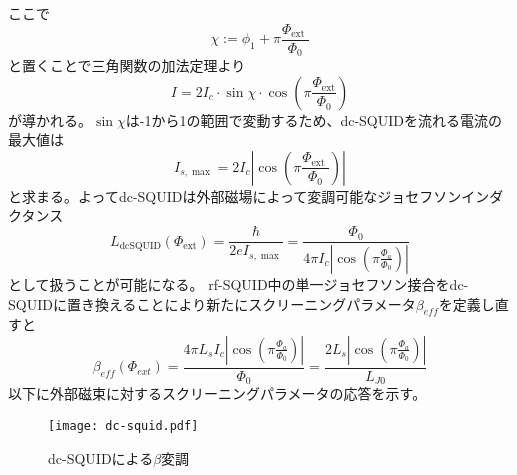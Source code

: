         ここで
        \begin{equation}
            \chi:=\phi_{1}+\pi \frac{\Phi_{\text {ext }}}{\Phi_{0}}
        \end{equation}
        と置くことで三角関数の加法定理より
        \begin{equation}
            I=2 I_{c} \cdot \sin \chi \cdot \cos \left(\pi \frac{\Phi_{\mathrm{ext}}}{\Phi_{0}}\right)
            \end{equation}
        が導かれる。$\sin\chi$は-1から1の範囲で変動するため、dc-SQUIDを流れる電流の最大値は
        \begin{equation}
            I_{s, \max }=2 I_{c}\left|\cos \left(\pi \frac{\Phi_{\text {ext }}}{\Phi_{0}}\right)\right|
        \end{equation}
        と求まる。よってdc-SQUIDは外部磁場によって変調可能なジョセフソンインダクタンス
        \begin{equation}
            L_{\mathrm{dcSQUID}}\left(\Phi_{\mathrm{ext}}\right)=\frac{\hbar}{2 e I_{s, \max }}=\frac{\Phi_{0}}{4 \pi I_{c}\left|\cos \left(\pi \frac{\Phi_{a}}{\Phi_{0}}\right)\right|}
        \end{equation}
        として扱うことが可能になる。
        rf-SQUID中の単一ジョセフソン接合をdc-SQUIDに置き換えることにより新たにスクリーニングパラメータ$\beta_{eff}$を定義し直すと
        \begin{equation}
            \beta_{eff}(\Phi_{ext}) = \frac{4\pi L_{s}I_{c}\left|\cos \left(\pi \frac{\Phi_{a}}{\Phi_{0}}\right)\right|}{\Phi_0}=\frac{2L_s\left|\cos \left(\pi \frac{\Phi_{a}}{\Phi_{0}}\right)\right|}{L_{J0}}
        \end{equation}
        以下に外部磁束に対するスクリーニングパラメータの応答を示す。
        \begin{figure}[H]
            \centering
            \texttt{[image: dc-squid.pdf]}
            \caption{dc-SQUIDによる$\beta$変調}
        \end{figure}

